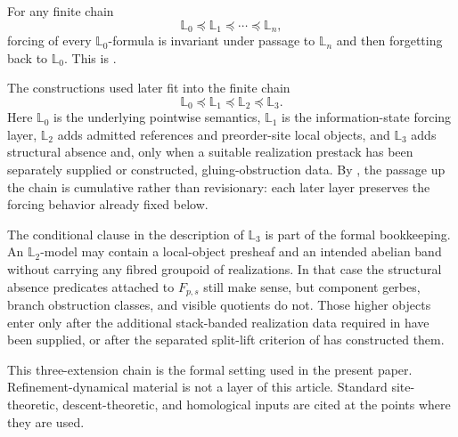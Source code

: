 \begin{corollary}\label{cor:whole-chain-invariance}
For any finite chain
\[
\mathbb L_0\preceq\mathbb L_1\preceq\cdots\preceq\mathbb L_n,
\]
forcing of every $\mathbb L_0$-formula is invariant under passage to
$\mathbb L_n$ and then forgetting back to $\mathbb L_0$. This is
\cite[Corollary~2.4]{HomologicalVisibilityGluingObstructions2026}.
\end{corollary}

The constructions used later fit into the finite chain
\[
\mathbb{L}_0
\preceq
\mathbb{L}_1
\preceq
\mathbb{L}_2
\preceq
\mathbb{L}_3.
\]
Here $\mathbb{L}_0$ is the underlying pointwise semantics, $\mathbb{L}_1$ is the
information-state forcing layer, $\mathbb{L}_2$ adds admitted references and
preorder-site local objects, and $\mathbb{L}_3$ adds structural absence and,
only when a suitable realization prestack has been separately supplied or
constructed, gluing-obstruction data. By , the
passage up the chain is cumulative rather than revisionary: each later layer
preserves the forcing behavior already fixed below.

The conditional clause in the description of $\mathbb{L}_3$ is part of the formal bookkeeping. An $\mathbb{L}_2$-model may contain a local-object presheaf and an intended abelian band without carrying any fibred groupoid of realizations. In that case the structural absence predicates attached to $F_{p,s}$ still make sense, but component gerbes, branch obstruction classes, and visible quotients do not. Those higher objects enter only after the additional stack-banded realization data required in  have been supplied, or after the separated split-lift criterion of  has constructed them.

This three-extension chain is the formal setting used in the present paper.
Refinement-dynamical material is not a layer of this article. Standard
site-theoretic, descent-theoretic, and homological inputs are cited at the
points where they are used.
